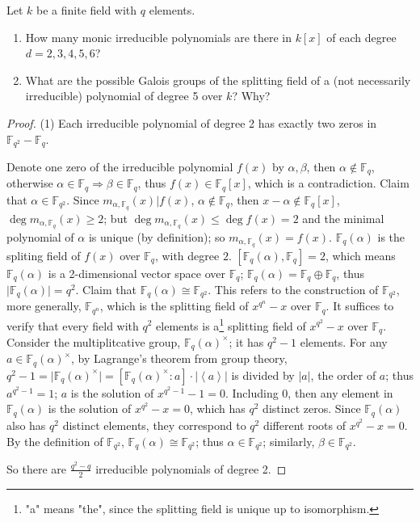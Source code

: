 \begin{exercise}
Let $k$ be a finite field with $q$ elements.
	\begin{enumerate}
		\item How many monic irreducible polynomials are there in $k[x]$ of each degree $d=2,3,4,5,6$?
		\item What are the possible Galois groups of the splitting field of a (not necessarily irreducible) polynomial of degree 5 over $k$? Why?
	\end{enumerate}
\end{exercise}
\begin{proof}
(1) Each irreducible polynomial of degree 2 has exactly two zeros in $\mathbb{F}_{q^2}-\mathbb{F}_q$.

\begin{note}
Denote one zero of the irreducible polynomial $f(x)$ by $\alpha,\beta$, then $\alpha \not\in \mathbb{F}_{q}$, otherwise $\alpha\in \mathbb{F}_{q}\Rightarrow\beta\in \mathbb{F}_{q}$, thus $f (x)\in \mathbb{F}_{q}[x]$, which is a contradiction.
Claim that $\alpha\in \mathbb{F}_{q^2}$. Since $m_{\alpha,\mathbb{F}_{q}}(x)|f(x)$, $\alpha \not\in \mathbb{F}_{q}$, then $x-\alpha \not\in \mathbb{F}_{q}[x]$, $\deg m_{\alpha,\mathbb{F}_{q}}(x)\geq2$; but $\deg m_{\alpha,\mathbb{F}_{q}}(x)\leq \deg f(x)=2$ and the minimal polynomial of $\alpha$ is unique (by definition); so $m_{\alpha,\mathbb{F}_{q}}(x)=f(x)$. $\mathbb{F}_{q}(\alpha)$ is the spliting field of $f(x)$ over $\mathbb{F}_{q}$, with degree $2$. $[\mathbb{F}_{q}(\alpha),\mathbb{F}_{q}]=2$, which means $\mathbb{F}_{q}(\alpha)$ is a 2-dimensional vector space over $\mathbb{F}_{q}$; $\mathbb{F}_{q}(\alpha)=\mathbb{F}_{q}\oplus \mathbb{F}_{q}$, thus $\lvert \mathbb{F}_{q}(\alpha) \rvert=q^2$.
Claim that $\mathbb{F}_{q}(\alpha)\cong \mathbb{F}_{q^2}$. This refers to the construction of $\mathbb{F}_{q^2}$, more generally, $\mathbb{F}_{q^n}$, which is the splitting field of $x^{q^{n}}-x$ over $\mathbb{F}_{q}$. It suffices to verify that every field with $q^2$ elements is a\footnote{"a" means "the", since the splitting field is unique up to isomorphism.} splitting field of $x^{q^{2}}-x$ over $\mathbb{F}_{q}$. Consider the multiplitcative group, $\mathbb{F}_{q}(\alpha)^{\times}$; it has $q^2-1$ elements. For any $a\in \mathbb{F}_{q}(\alpha)^{\times}$, by Lagrange's theorem from group theory, $q^2-1=\lvert \mathbb{F}_{q}(\alpha)^{\times} \rvert=[\mathbb{F}_{q}(\alpha)^{\times}:a]\cdot \lvert \left< a \right> \rvert$ is divided by $\lvert a \rvert$, the order of $a$; thus $a^{q^2-1}=1$; $a$ is the solution of $x^{q^2-1}-1=0$. Including $0$, then any element in $\mathbb{F}_{q}(\alpha)$ is the solution of $x^{q^2}-x=0$, which has $q^2$ distinct zeros. Since $\mathbb{F}_{q}(\alpha)$ also has $q^2$ distinct elements, they correspond to $q^2$ different roots of $x^{q^2}-x=0$. By the definition of $\mathbb{F}_{q^2}$, $\mathbb{F}_{q}(\alpha)\cong \mathbb{F}_{q^2}$; thus $\alpha\in \mathbb{F}_{q^2}$; similarly, $\beta\in \mathbb{F}_{q^2}$.
\end{note}
So there are $\frac{q^2-q}{2}$ irreducible polynomials of degree 2.


\end{proof}
